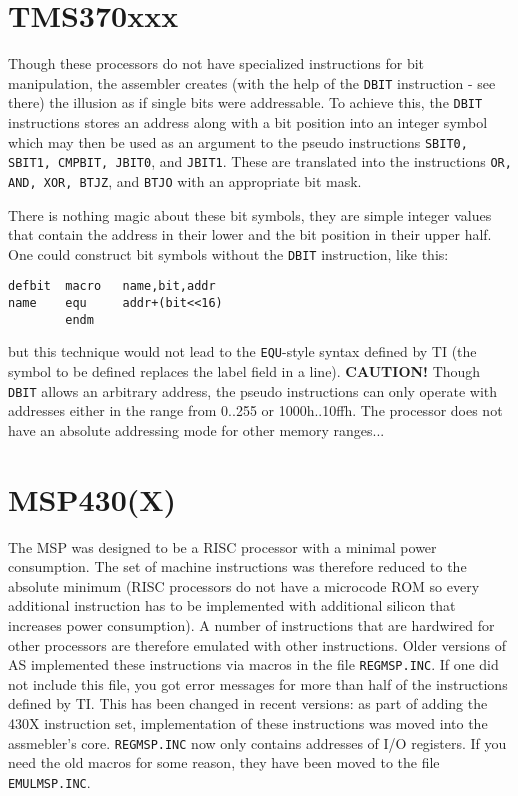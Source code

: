 \documentclass[12pt,twoside]{report}
\newcommand{\bb}[1]{{\bf #1}}
\newcommand{\tty}[1]{{\tt #1}}
\begin{document}

\section{TMS370xxx}

Though these processors do not have specialized instructions for bit
manipulation, the assembler creates (with the help of the \tty{DBIT}
instruction - see there) the illusion as if single bits were
addressable.  To achieve this, the \tty{DBIT} instructions stores an
address along with a bit position into an integer symbol which may
then be used as an argument to the pseudo instructions \tty{SBIT0, SBIT1,
CMPBIT, JBIT0}, and \tty{JBIT1}.  These are translated into the instructions
\tty{OR, AND, XOR, BTJZ}, and \tty{BTJO} with an appropriate bit mask.

There is nothing magic about these bit symbols, they are simple
integer values that contain the address in their lower and the bit
position in their upper half.  One could construct bit symbols
without the \tty{DBIT} instruction, like this:
\begin{verbatim}
defbit  macro   name,bit,addr
name    equ     addr+(bit<<16)
        endm
\end{verbatim}
but this technique would not lead to the \tty{EQU}-style syntax defined by
TI (the symbol to be defined replaces the label field in a line).
\bb{CAUTION!} Though \tty{DBIT} allows an arbitrary address, the pseudo
instructions can only operate with addresses either in the range from
0..255 or 1000h..10ffh.  The processor does not have an absolute
addressing mode for other memory ranges...


\section{MSP430(X)}
\label{MSPSpec}

The MSP was designed to be a RISC processor with a minimal power
consumption.  The set of machine instructions was therefore reduced
to the absolute minimum (RISC processors do not have a microcode ROM
so every additional instruction has to be implemented with additional
silicon that increases power consumption).  A number of instructions
that are hardwired for other processors are therefore emulated with
other instructions.  Older versions of AS implemented these
instructions via macros in the file \tty{REGMSP.INC}.  If one did
not include this file, you got error messages for more than
half of the instructions defined by TI.  This has been changed in
recent versions: as part of adding the 430X instruction set,
implementation of these instructions was moved into the assmebler's
core.  \tty{REGMSP.INC} now only contains addresses of I/O
registers.  If you need the old macros for some reason, they have
been moved to the file \tty{EMULMSP.INC}.
\end{document}
